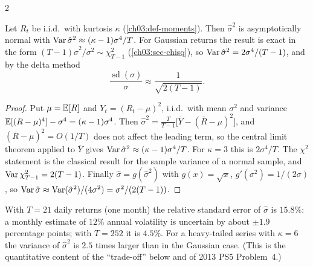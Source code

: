 \begin{paracol}{2}
\begin{proposition}\label{ch13:prop-precision}
Let $R_t$ be i.i.d.\ with kurtosis $\kappa$ (\cref{ch03:def-moments}). Then $\hat\sigma^2$ is asymptotically normal with
$\operatorname{Var}\hat\sigma^2\approx(\kappa-1)\sigma^4/T$. For Gaussian returns the result is exact in the form
$(T-1)\hat\sigma^2/\sigma^2\sim\chi^2_{T-1}$ (\cref{ch03:sec-chisq}), so $\operatorname{Var}\hat\sigma^2=2\sigma^4/(T-1)$, and by the delta method
\[
  \frac{\operatorname{sd}(\hat\sigma)}{\sigma}\approx\frac1{\sqrt{2(T-1)}} .
\]
\end{proposition}
\begin{proof}
Put $\mu=\mathbb{E}[R]$ and $Y_t=(R_t-\mu)^2$, i.i.d.\ with mean $\sigma^2$ and variance $\mathbb{E}[(R-\mu)^4]-\sigma^4=(\kappa-1)\sigma^4$.
Then $\hat\sigma^2=\frac{T}{T-1}\bigl[\overline Y-(\bar R-\mu)^2\bigr]$, and $(\bar R-\mu)^2=O(1/T)$ does not affect the leading term, so
the central limit theorem applied to $\overline Y$ gives $\operatorname{Var}\hat\sigma^2\approx(\kappa-1)\sigma^4/T$. For $\kappa=3$ this is $2\sigma^4/T$.
The $\chi^2$ statement is the classical result for the sample variance of a normal sample, and $\operatorname{Var}\chi^2_{T-1}=2(T-1)$. Finally
$\hat\sigma=g(\hat\sigma^2)$ with $g(x)=\sqrt x$, $g'(\sigma^2)=1/(2\sigma)$, so $\operatorname{Var}\hat\sigma\approx\operatorname{Var}(\hat\sigma^2)/(4\sigma^2)=\sigma^2/(2(T-1))$.
\end{proof}
With $T=21$ daily returns (one month) the relative standard error of $\hat\sigma$ is $15.8\%$: a monthly estimate
of $12\%$ annual volatility is uncertain by about $\pm1.9$ percentage points; with $T=252$ it is $4.5\%$. For a
heavy-tailed series with $\kappa=6$ the variance of $\hat\sigma^2$ is $2.5$ times larger than in the Gaussian case.
(This is the quantitative content of the ``trade-off'' below and of 2013 PS5 Problem~4.)


\end{paracol}
